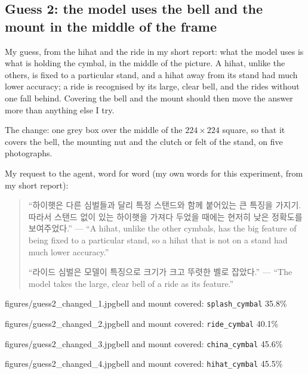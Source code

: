 \documentclass[11pt]{article}
\begin{document}
\subsection*{Guess 2: the model uses the bell and the mount in the middle of the
frame}

My guess, from the hihat and the ride in my short report: what the model uses is
what is holding the cymbal, in the middle of the picture. A hihat, unlike the
others, is fixed to a particular stand, and a hihat away from its stand had much
lower accuracy; a ride is recognised by its large, clear bell, and the rides
without one fall behind. Covering the bell and the mount should then move the
answer more than anything else I try.

The change: one grey box over the middle of the $224 \times 224$ square, so that
it covers the bell, the mounting nut and the clutch or felt of the stand, on
five photographs.

My request to the agent, word for word (my own words for this experiment, from
my short report):
\begin{quote}
“하이햇은 다른 심벌들과 달리 특정 스탠드와 함께 붙어있는 큰 특징을 가지기.
따라서 스탠드 없이 있는 하이햇을 가져다 두었을 때에는 현저히 낮은 정확도를
보여주었다.” --- ``A hihat, unlike the other cymbals, has the big feature of
being fixed to a particular stand, so a hihat that is not on a stand had much
lower accuracy.''

“라이드 심벌은 모델이 특징으로 크기가 크고 뚜렷한 벨로 잡았다.” --- ``The
model takes the large, clear bell of a ride as its feature.''
\end{quote}

{figures/guess2_changed_1.jpg}{bell and mount covered:
\texttt{splash\_cymbal} 35.8\%}

{figures/guess2_changed_2.jpg}{bell and mount covered:
\texttt{ride\_cymbal} 40.1\%}

{figures/guess2_changed_3.jpg}{bell and mount covered:
\texttt{china\_cymbal} 45.6\%}

{figures/guess2_changed_4.jpg}{bell and mount covered:
\texttt{hihat\_cymbal} 45.5\%}
\end{document}
